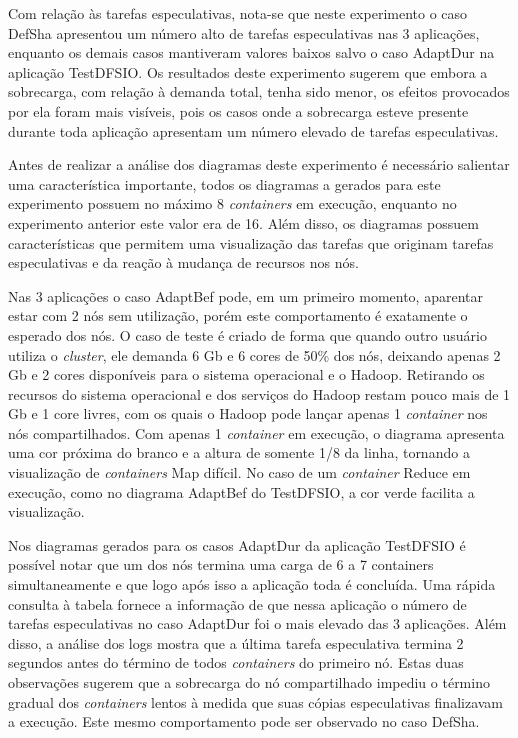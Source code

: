Com relação às tarefas especulativas, nota-se que neste experimento o caso DefSha apresentou um número alto de tarefas especulativas nas 3 aplicações, enquanto os demais casos mantiveram valores baixos salvo o caso AdaptDur na aplicação TestDFSIO. Os resultados deste experimento sugerem que embora a sobrecarga, com relação à demanda total, tenha sido menor, os efeitos provocados por ela foram mais visíveis, pois os casos onde a sobrecarga esteve presente durante toda aplicação apresentam um número elevado de tarefas especulativas.

Antes de realizar a análise dos diagramas deste experimento é necessário salientar uma característica importante, todos os diagramas a gerados para este experimento possuem no máximo 8 \textit{containers} em execução, enquanto no experimento anterior este valor era de 16. Além disso, os diagramas possuem características que permitem uma visualização das tarefas que originam tarefas especulativas e da reação à mudança de recursos nos nós. 

Nas 3 aplicações o caso AdaptBef pode, em um primeiro momento, aparentar estar com 2 nós sem utilização, porém este comportamento é exatamente o esperado dos nós. O caso de teste é criado de forma que quando outro usuário utiliza o \textit{cluster}, ele demanda 6 Gb e 6 cores de 50\% dos nós, deixando apenas 2 Gb e 2 cores disponíveis para o sistema operacional e o Hadoop. Retirando os recursos do sistema operacional e dos serviços do Hadoop restam pouco mais de 1 Gb e 1 core livres, com os quais o Hadoop pode lançar apenas 1 \textit{container} nos nós compartilhados. Com apenas 1 \textit{container} em execução, o diagrama apresenta uma cor próxima do branco e a altura de somente 1/8 da linha, tornando a visualização de \textit{containers} Map difícil. No caso de um \textit{container} Reduce em execução, como no diagrama AdaptBef do TestDFSIO, a cor verde facilita a visualização.

Nos diagramas gerados para os casos AdaptDur da aplicação TestDFSIO é possível notar que um dos nós termina uma carga de 6 a 7 containers simultaneamente e que logo após isso a aplicação toda é concluída. Uma rápida consulta à tabela fornece a informação de que nessa aplicação o número de tarefas especulativas no caso AdaptDur foi o mais elevado das 3 aplicações. Além disso, a análise dos logs mostra que a última tarefa especulativa termina 2 segundos antes do término de todos \textit{containers} do primeiro nó. Estas duas observações sugerem que a sobrecarga do nó compartilhado impediu o término gradual dos \textit{containers} lentos à medida que suas cópias especulativas finalizavam a execução. Este mesmo comportamento pode ser observado no caso DefSha.

